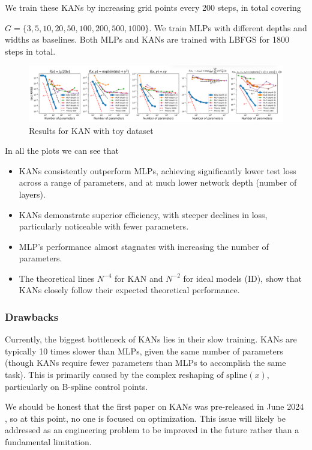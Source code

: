 We train these KANs by increasing grid points every 200 steps, in total covering

$G =\{3, 5, 10, 20, 50, 100, 200, 500, 1000\}$. We train MLPs with different depths and widths as baselines. Both MLPs and KANs are trained with LBFGS for 1800 steps in total.


\begin{figure}[H]
    \centering
    \includegraphics[width=0.95\linewidth]{Images/result.png}
    \caption{Results for KAN with toy dataset}
    \label{fig:re}
\end{figure}

In all the plots we can see that
\begin{itemize}
    \item KANs consistently outperform MLPs, achieving significantly lower test loss across a range of parameters, and at much lower network depth (number of layers).
    \item KANs demonstrate superior efficiency, with steeper declines in loss, particularly noticeable with fewer parameters.
    \item MLP's performance almost stagnates with increasing the number of parameters.
    \item The theoretical lines $N^{-4}$ for KAN and $N^{-2}$ for ideal models (ID), show that KANs closely follow their expected theoretical performance.
\end{itemize}

\subsubsection{Drawbacks}
Currently, the biggest bottleneck of KANs lies in their slow training. KANs are typically 10 times slower than MLPs, given the same number of parameters (though KANs require fewer parameters than MLPs to accomplish the same task). This is primarily caused by the complex reshaping of $\text{spline}(x)$, particularly on B-spline control points.

We should be honest that the first paper on KANs was pre-released in June 2024 \cite{KAN}, so at this point, no one is focused on optimization. This issue will likely be addressed as an engineering problem to be improved in the future rather than a fundamental limitation.

